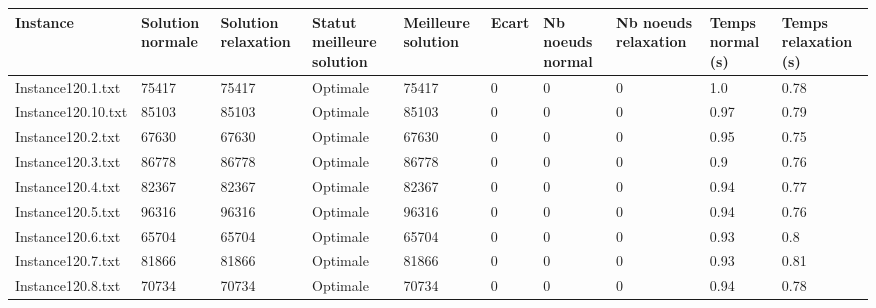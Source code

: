 \documentclass[a4paper,12pt]{article}
\theoremstyle{blueDefinition}
\theoremstyle{redProperty}
\begin{document}
\begin{table}[htbp]
\hspace*{-2cm} 
\begin{tabular}{|l|p{40pt}|p{40pt}|p{55pt}|p{45pt}|p{35pt}|p{35pt}|p{35pt}|p{35pt}|p{35pt}|}
\hline Instance           & Solution normale & Solution relaxation & Statut meilleure solution & Meilleure solution & Ecart & Nb noeuds normal & Nb noeuds relaxation & Temps normal (s) & Temps relaxation (s) \\ \hline
Instance120.1.txt  & 75417            & 75417               & Optimale                   & 75417              & 0          & 0                & 0                    & 1.0              & 0.78                 \\
Instance120.10.txt & 85103            & 85103               & Optimale                   & 85103              & 0          & 0                & 0                    & 0.97             & 0.79                 \\
Instance120.2.txt  & 67630            & 67630               & Optimale                   & 67630              & 0          & 0                & 0                    & 0.95             & 0.75                 \\
Instance120.3.txt  & 86778            & 86778               & Optimale                   & 86778              & 0          & 0                & 0                    & 0.9              & 0.76                 \\
Instance120.4.txt  & 82367            & 82367               & Optimale                   & 82367              & 0          & 0                & 0                    & 0.94             & 0.77                 \\
Instance120.5.txt  & 96316            & 96316               & Optimale                   & 96316              & 0          & 0                & 0                    & 0.94             & 0.76                 \\
Instance120.6.txt  & 65704            & 65704               & Optimale                   & 65704              & 0          & 0                & 0                    & 0.93             & 0.8                  \\
Instance120.7.txt  & 81866            & 81866               & Optimale                   & 81866              & 0          & 0                & 0                    & 0.93             & 0.81                 \\
Instance120.8.txt  & 70734            & 70734               & Optimale                   & 70734              & 0          & 0                & 0                    & 0.94             & 0.78                 \\

\end{tabular}
\end{table}
\end{document}
